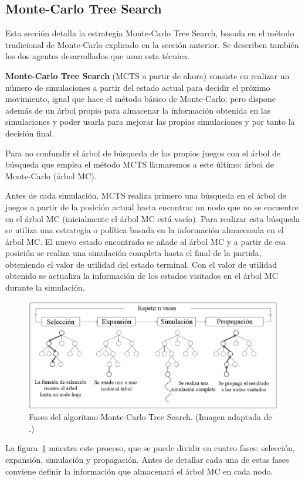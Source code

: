 \subsection{Monte-Carlo Tree Search}
\label{ssec:monteCarloTreeSearch}
Esta sección detalla la estrategia Monte-Carlo Tree Search, basada en el método tradicional de Monte-Carlo explicado en la sección anterior.
Se describen también los dos agentes desarrollados que usan esta técnica.

\bigskip
\textbf{Monte-Carlo Tree Search} (MCTS a partir de ahora) consiste en realizar un número de simulaciones a partir del estado actual para decidir el próximo movimiento, igual que hace el método básico de Monte-Carlo; pero dispone además de un árbol propio para almacenar la información obtenida en las simulaciones y poder usarla para mejorar las propias simulaciones y por tanto la decisión final.

Para no confundir el árbol de búsqueda de los propios juegos con el árbol de búsqueda que emplea el método MCTS llamaremos a este último: árbol de Monte-Carlo (árbol MC).

Antes de cada simulación, MCTS realiza primero una búsqueda en el árbol de juegos a partir de la posición actual hasta encontrar un nodo que no se encuentre en el árbol MC (inicialmente el árbol MC está vacío).
Para realizar esta búsqueda se utiliza una estrategia o política basada en la información almacenada en el árbol MC.
El nuevo estado encontrado se añade al árbol MC y a partir de esa posición se realiza una simulación completa hasta el final de la partida, obteniendo el valor de utilidad del estado terminal.
Con el valor de utilidad obtenido se actualiza la información de los estados visitados en el árbol MC durante la simulación.
\begin{figure}[h]
	\centering
	\includegraphics[scale=0.45]{contenido/cap3/imagenes/mcts1.eps}
	\caption[Fases del algoritmo Monte-Carlo Tree Search.]%
	{Fases del algoritmo Monte-Carlo Tree Search. (Imagen adaptada de .)}
	\label{fig:mcts1}
\end{figure}
La figura~\ref{fig:mcts1} muestra este proceso, que se puede dividir en cuatro fases:
selección, expansión, simulación y propagación.
Antes de detallar cada una de estas fases conviene definir la información que almacenará el árbol MC en cada nodo.


